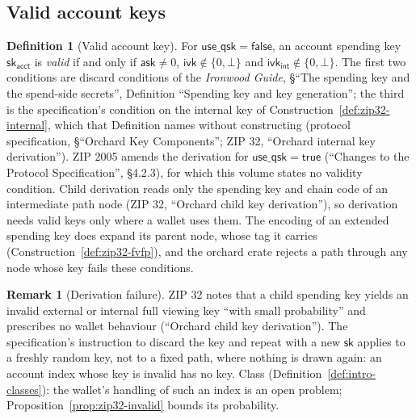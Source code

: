 \documentclass[11pt,a4paper]{article}
\theoremstyle{definition}
\newtheorem{definition}[theorem]{Definition}
\newtheorem{remark}[theorem]{Remark}
\newcommand{\ask}{\ensuremath{\mathsf{ask}}}
\newcommand{\ivk}{\ensuremath{\mathsf{ivk}}}
\begin{document}
\subsection{Valid account keys}\label{sec:zip32-valid}

\begin{definition}[Valid account key]\label{def:zip32-valid}
For $\mathsf{use\_qsk} = \mathsf{false}$, an account spending key
$\mathsf{sk}_{\mathsf{acct}}$ is \emph{valid} if and only if $\ask \neq 0$,
$\ivk \notin \{0, \bot\}$ and $\ivk_{\mathsf{int}} \notin \{0, \bot\}$. The
first two conditions are discard conditions of the \emph{Ironwood Guide},
\S``The spending key and the spend-side secrets'', Definition ``Spending key and
key generation''; the third is the specification's condition on the internal key
of Construction~\ref{def:zip32-internal}, which that Definition names without
constructing (protocol specification, \S``Orchard Key Components''; ZIP 32,
``Orchard internal key derivation''). ZIP 2005 amends the derivation for
$\mathsf{use\_qsk} = \mathsf{true}$ (``Changes to the Protocol Specification'',
\S 4.2.3), for which this volume states no validity condition. Child
derivation reads only the spending key and chain code of an intermediate
path node (ZIP 32, ``Orchard child key derivation''), so derivation needs
valid keys only where a wallet uses them. The encoding of an extended
spending key does expand its parent node, whose tag it carries
(Construction~\ref{def:zip32-fvfp}), and the \textsf{orchard} crate rejects
a path through any node whose key fails these conditions.
\end{definition}

\begin{remark}[Derivation failure]\label{rem:zip32-failure}
ZIP 32 notes that a child spending key yields an invalid external or
internal full viewing key ``with small probability'' and prescribes no
wallet behaviour (``Orchard child key derivation''). The specification's
instruction to discard the key and repeat with a new $\mathsf{sk}$ applies
to a freshly random key, not to a fixed path, where nothing is drawn again:
an account index whose key is invalid has no key. Class
(Definition~\ref{def:intro-classes}): the wallet's handling of such an
index is an open problem; Proposition~\ref{prop:zip32-invalid} bounds its
probability.
\end{remark}
\end{document}
